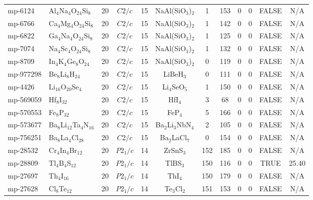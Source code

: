 {\begin{longtable}{llcccccccccc}
    mp-6124 & Al$_{4}$Na$_{4}$O$_{24}$Si$_{8}$ & 20    & $C2/c$ & 15    & NaAl(SiO$_{3}$)$_{2}$ & 1     & 153   & 0     & 0     & FALSE & N/A \\
    mp-6766 & Ca$_{4}$Mg$_{4}$O$_{24}$Si$_{8}$ & 20    & $C2/c$ & 15    & NaAl(SiO$_{3}$)$_{2}$ & 1     & 142   & 0     & 0     & FALSE & N/A \\
    mp-6822 & Ga$_{4}$Na$_{4}$O$_{24}$Si$_{8}$ & 20    & $C2/c$ & 15    & NaAl(SiO$_{3}$)$_{2}$ & 1     & 125   & 0     & 0     & FALSE & N/A \\
    mp-7074 & Na$_{4}$Sc$_{4}$O$_{24}$Si$_{8}$ & 20    & $C2/c$ & 15    & NaAl(SiO$_{3}$)$_{2}$ & 1     & 132   & 0     & 0     & FALSE & N/A \\
    mp-8709 & In$_{4}$K$_{4}$Ge$_{8}$O$_{24}$ & 20    & $C2/c$ & 15    & NaAl(SiO$_{3}$)$_{2}$ & 0     & 119   & 0     & 0     & FALSE & N/A \\
    mp-977298 & Be$_{8}$Li$_{8}$H$_{24}$ & 20    & $C2/c$ & 15    & LiBeH$_{3}$ & 0     & 111   & 0     & 0     & FALSE & N/A \\
    mp-4426 & Li$_{16}$O$_{20}$Se$_{4}$ & 20    & $C2/c$ & 15    & Li$_{4}$SeO$_{5}$ & 1     & 150   & 0     & 0     & FALSE & N/A \\
    mp-569059 & Hf$_{8}$I$_{32}$ & 20    & $C2/c$ & 15    & HfI$_{4}$ & 3     & 68    & 0     & 0     & FALSE & N/A \\
    mp-570553 & Fe$_{8}$P$_{32}$ & 20    & $C2/c$ & 15    & FeP$_{4}$ & 5     & 166   & 0     & 0     & FALSE & N/A \\
    mp-573677 & Ba$_{8}$Li$_{12}$Ta$_{4}$N$_{16}$ & 20    & $C2/c$ & 15    & Ba$_{2}$Li$_{3}$NbN$_{4}$ & 2     & 105   & 0     & 0     & FALSE & N/A \\
    mp-756251 & Ba$_{8}$La$_{4}$Cl$_{28}$ & 20    & $C2/c$ & 15    & Ba$_{2}$LaCl$_{7}$ & 0     & 154   & 0     & 0     & FALSE & N/A \\
    mp-28532 & Cr$_{4}$In$_{4}$Br$_{12}$ & 20    & $P2_1/c$ & 14    & ZrSnS$_{3}$ & 152   & 185   & 0     & 0     & FALSE & N/A \\
    mp-28809 & Tl$_{4}$B$_{4}$S$_{12}$ & 20    & $P2_1/c$ & 14    & TlBS$_{3}$ & 150   & 116   & 0     & 0     & TRUE  & 25.40  \\
    mp-27697 & Th$_{4}$I$_{16}$ & 20    & $P2_1/c$ & 14    & ThI$_{4}$ & 150   & 179   & 0     & 0     & FALSE & N/A \\
    mp-27628 & Cl$_{8}$Te$_{12}$ & 20    & $P2_1/c$ & 14    & Te$_{3}$Cl$_{2}$ & 151   & 153   & 0     & 0     & FALSE & N/A \\

\end{longtable}}
